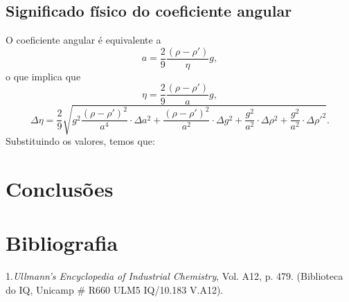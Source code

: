 \documentclass[12pt,a4paper]{article}
\begin{document}
\subsection{Significado físico do coeficiente angular}
O coeficiente angular  é equivalente a
$$a = \frac{2}{9} \frac{(\rho - \rho ')}{\eta}g,$$ 
o que implica que 
$$\eta = \frac{2}{9} \frac{(\rho - \rho ')}{a}g,$$
$$\Delta\eta = \frac{2}{9}\sqrt{g^2\frac{(\rho - \rho ')^2}{a^4} \cdot \Delta a^2 + \frac{(\rho - \rho ')^2}{a^2}\cdot \Delta g^2 + \frac{g^2}{a^2} \cdot \Delta \rho ^2 + \frac{g^2}{a^2} \cdot \Delta \rho '^2}. $$
Substituindo os valores, temos que:



\section{Conclusões}


\section{Bibliografia}
1.\textit{Ullmann's Encyclopedia of Industrial Chemistry}, Vol. A12, p. 479. (Biblioteca do
IQ, Unicamp $\#$ R660 ULM5 IQ/10.183 V.A12).
\end{document}
